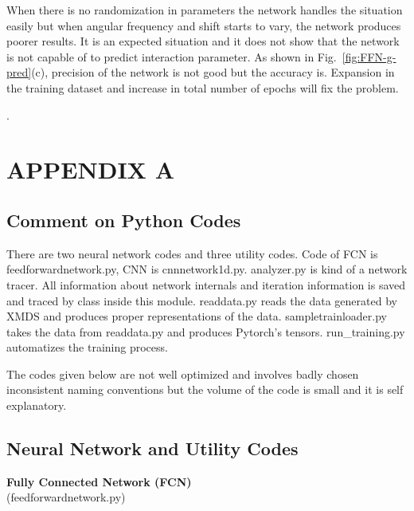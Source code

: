 \documentclass[a4paper,times,12pt]{article}
\begin{document}
When there is no randomization in parameters the network handles the situation easily but when angular frequency and shift starts to vary, the network produces poorer results. It is an expected situation and it does not show that the network is not capable of to predict interaction parameter. As shown in Fig.~\ref{fig:FFN-g-pred}(c), precision of the network is not good but the accuracy is. Expansion in the training dataset and increase in total number of epochs will fix the problem.

\cite{barenghi2016primer}.
\cite{nielsen2015neural}
\cite{mills2017deep}
\cite{goodfellow2016deep}
\cite{dennis2013xmds2}
\cite{muruganandam2009fortran}
\cite{zimmermann2011comparison}
\cite{paszke2017automatic}





\appendix
\section{APPENDIX A}

\subsection{Comment on Python Codes}

There are two neural network codes and three utility codes. Code of FCN is feedforwardnetwork.py, CNN is cnnnetwork1d.py. analyzer.py is kind of a network tracer. All information about network internals and iteration information is saved and traced by class inside this module. readdata.py reads the data generated by XMDS and produces proper representations of the data. sampletrainloader.py takes the data from readdata.py and produces Pytorch's tensors. run\_training.py automatizes the training process. 


The codes given below are not well optimized and involves badly chosen inconsistent naming conventions but the volume of the code is small and it is self explanatory. 

\subsection{Neural Network and Utility Codes}

\textbf{Fully Connected Network (FCN)}\\
(feedforwardnetwork.py)
\inputminted[breaklines]{python}{../Src/feedforwardnetwork.py}
\end{document}
